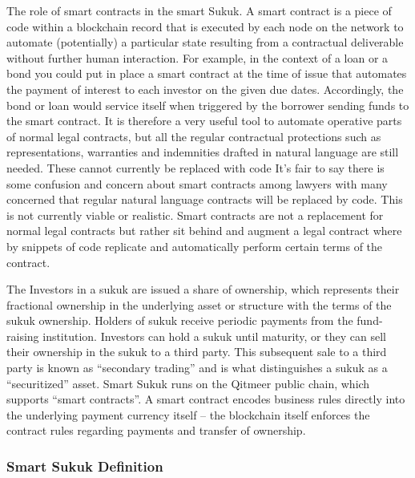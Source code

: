 \documentclass[a4paper,11pt]{article}
\begin{document}
The role of smart contracts in the smart Sukuk.  A smart contract is a piece of code within a blockchain record that is executed by each node on the network to automate (potentially) a particular state resulting from a contractual deliverable without further human interaction. For example, in the context of a loan or a bond you could put in place a smart contract at the time of issue that automates the payment of interest to each investor on the given due dates. Accordingly, the bond or loan would service itself when triggered by the borrower sending funds to the smart contract. It is therefore a very useful tool to automate operative parts of normal legal contracts, but all the regular contractual protections such as representations, warranties and indemnities drafted in natural language are still needed. These cannot currently be replaced with code It’s fair to say there is some confusion and concern about smart contracts among lawyers with many concerned that regular natural language contracts will be replaced by code. This is not currently viable or realistic. Smart contracts are not a replacement for normal legal contracts but rather sit behind and augment a legal contract where by snippets of code replicate and automatically perform certain terms of the contract.

The Investors in a sukuk are issued a share of ownership, which represents their fractional ownership in the underlying asset or structure with the terms of the sukuk ownership. Holders of sukuk receive periodic payments from the fund-raising institution. Investors can hold a sukuk until maturity, or they can sell their ownership in the sukuk to a third party. This subsequent sale to a third party is known as “secondary trading” and is what distinguishes a sukuk as a “securitized” asset.
Smart Sukuk runs on the Qitmeer public chain, which supports “smart contracts”. A smart contract encodes business rules directly into the underlying payment currency itself – the blockchain itself enforces the contract rules regarding payments and transfer of ownership.

\subsubsection{Smart Sukuk Definition} 
\end{document}
